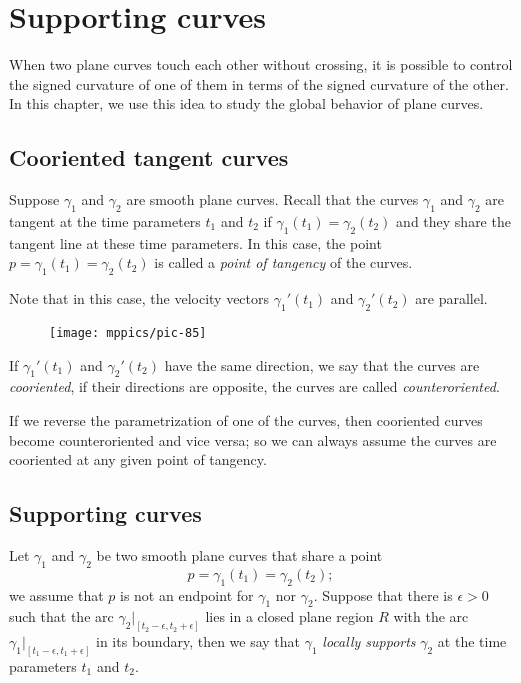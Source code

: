 \chapter{Supporting curves}
\label{chap:supporting-curves}

When two plane curves touch each other without crossing, it is possible to control the signed curvature of one of them in terms of the signed curvature of the other.
In this chapter, we use this idea to study the global behavior of plane curves.

\section{Cooriented tangent curves}

Suppose $\gamma_1$ and $\gamma_2$ are smooth plane curves.
Recall that the curves $\gamma_1$ and $\gamma_2$ are tangent at the  time parameters $t_1$ and $t_2$
if $\gamma_1(t_1)=\gamma_2(t_2)$
and they share the tangent line at these time parameters.
In this case, the point $p=\gamma_1(t_1)=\gamma_2(t_2)$ is called a \emph{point of tangency} of the curves.

Note that in this case, the velocity vectors $\gamma_1'(t_1)$ and $\gamma_2'(t_2)$ are parallel.
\begin{figure}[!ht]
\vskip-0mm
\centering
\texttt{[image: mppics/pic-85]}
\vskip-0mm
\end{figure}
If $\gamma_1'(t_1)$ and $\gamma_2'(t_2)$ have the same direction, we say that the curves are \emph{cooriented},
if their directions are opposite, the curves are called \emph{counteroriented}.

If we reverse the parametrization of one of the curves, then cooriented curves become counteroriented and vice versa; so we can always assume the curves are cooriented at any given point of tangency.

\section{Supporting curves}

Let $\gamma_1$ and $\gamma_2$ be two smooth plane curves that share a point 
\[p=\gamma_1(t_1)=\gamma_2(t_2);\] 
we assume that $p$ is not an endpoint for $\gamma_1$ nor $\gamma_2$.
Suppose that there is $\epsilon>0$ such that the arc $\gamma_2|_{[t_2-\epsilon, t_2+\epsilon]}$ lies in a closed plane region $R$ with the arc $\gamma_1|_{[t_1-\epsilon, t_1+\epsilon]}$ in its boundary,
then we say that $\gamma_1$ \emph{locally supports} $\gamma_2$ at the time parameters $t_1$ and $t_2$.

